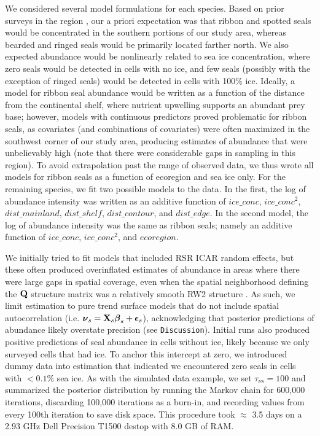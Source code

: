 \documentclass[12pt,fleqn]{article}
\begin{document}
\begin{flushleft}
\hspace{.5in}We considered several model formulations for each species.  Based on prior surveys in the region \citep[see e.g.][]{ConnEtAl2013,VerHoefEtAl2013}, our a priori expectation was that ribbon and spotted seals would be concentrated in the southern portions of our study area, whereas bearded and ringed seals would be primarily located farther north.  We also expected abundance would be nonlinearly related to sea ice concentration, where zero seals would be detected in cells with no ice, and few seals (possibly with the exception of ringed seals) would be detected in cells with 100\% ice.  Ideally, a model for ribbon seal abundance would be written as a function of the distance from the continental shelf, where nutrient upwelling supports an abundant prey base; however, models with continuous predictors proved problematic for ribbon seals, as covariates (and combinations of covariates) were often maximized in the southwest corner of our study area, producing estimates of abundance that were unbelievably high (note that there were considerable gaps in sampling in this region).  To avoid extrapolation past the range of observed data, we thus wrote all models for ribbon seals as a function of ecoregion and sea ice only.  For the remaining species,
we fit two possible models to the data.  In the first, the log of abundance intensity was written as an additive function of $ice\_conc$, $ice\_conc^2$, $dist\_mainland$, $dist\_shelf$, $dist\_contour$, and $dist\_edge$.  In the second model, the log of abundance intensity was the same as ribbon seals; namely an additive function of $ice\_conc$, $ice\_conc^2$, and $ecoregion$.

\hspace{.5in}We initially tried to fit models that included RSR ICAR random effects, but these often produced overinflated estimates of abundance in areas where there were large gaps in spatial coverage, even when the spatial neighborhood defining the ${\bf Q}$ structure matrix was a relatively smooth RW2 structure \citep[as in][section 3.4.2]{RueHeld2005}.  As such, we limit estimation to pure trend surface models that do not include spatial autocorrelation (i.e. $\boldsymbol{\nu}_s={\bf X}_s \boldsymbol{\beta}_s + \boldsymbol{\epsilon}_s$), acknowledging that posterior predictions of abundance likely overstate precision (see \texttt{Discussion}).  Initial runs also produced positive predictions of seal abundance in cells without ice, likely because we only surveyed cells that had ice.  To anchor this intercept at zero, we introduced dummy data into estimation that indicated we encountered zero seals in cells with $<0.1\%$ sea ice.  As with the simulated data example, we set $\tau_{\nu s}=100$ and summarized the posterior distribution by running the Markov chain for 600,000 iterations, discarding 100,000 iterations as a burn-in, and recording values from every 100th iteration to save disk space.  This procedure took $\approx$ 3.5 days on a 2.93 GHz Dell Precision T1500 destop with 8.0 GB of RAM.



\end{flushleft}
\end{document}

